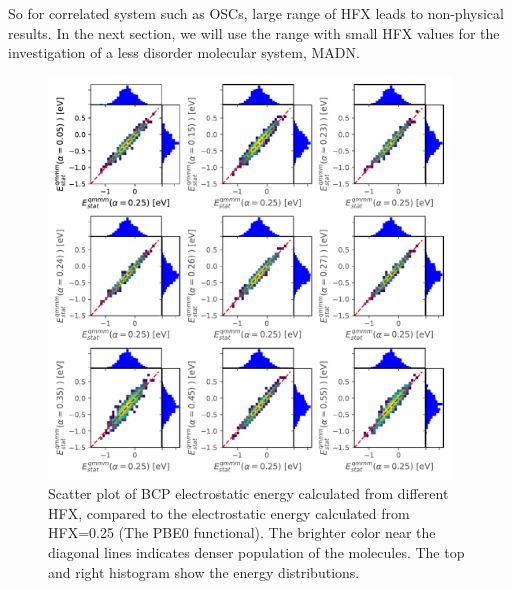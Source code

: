 \documentclass[letterpaper,12pt]{article}
\begin{document}
So for correlated system such as OSCs, large range of HFX leads to non-physical results. 
In the next section, we will use the range with small HFX values for the investigation of a less disorder molecular system, MADN. 

\begin{figure}[H]
    \centering
    \includegraphics[width=0.95\textwidth]{figs/BCP_HFX/scatterEstat_qmmm.pdf}
    \caption{Scatter plot of BCP electrostatic energy calculated from different HFX, compared to the electrostatic energy calculated from HFX=0.25 (The PBE0 functional). The brighter color near the diagonal lines indicates denser population of the molecules.  The top and right histogram show the energy distributions.}
    \label{fig:Estat_qmmm_BCP}
\end{figure}
\end{document}
